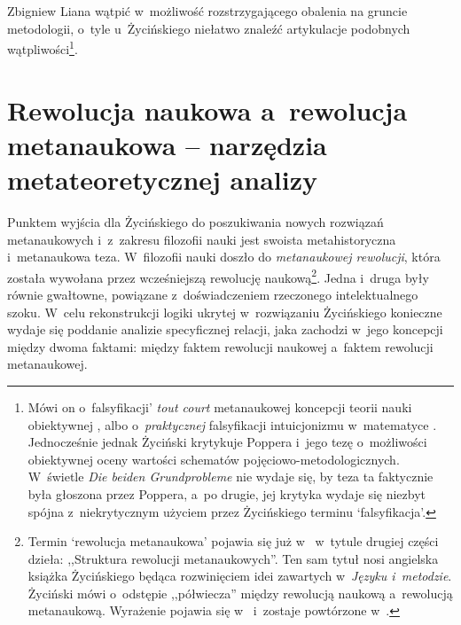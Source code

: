 \begin{artplenv}{Zbigniew Liana}
wątpić w~możliwość rozstrzygającego obalenia na gruncie metodologii, o~tyle u~Życińskiego niełatwo znaleźć artykulacje
podobnych wątpliwości\footnote{Mówi on o~falsyfikacji' \textit{tout court} metanaukowej koncepcji teorii nauki
obiektywnej
\parencites[s.~9]{zycinski_structure_1988}[s.~17]{zycinski_struktura_2013},
albo o~\textit{praktycznej} falsyfikacji
intuicjonizmu w~matematyce
\parencites[s.~97]{zycinski_structure_1988}[s.~174]{zycinski_struktura_2013}.
Jednocześnie jednak Życiński
\parencites*[s.~140]{zycinski_structure_1988}[s.~248]{zycinski_struktura_2013}
krytykuje Poppera i~jego tezę o~możliwości obiektywnej
oceny wartości schematów pojęciowo-metodologicznych. W~świetle \textit{Die beiden Grundprobleme} nie wydaje się, by teza
ta faktycznie była głoszona przez Poppera, a~po drugie, jej krytyka wydaje się niezbyt spójna z~niekrytycznym użyciem
przez Życińskiego terminu `falsyfikacja'.}.

\section{Rewolucja naukowa a~rewolucja metanaukowa -- narzędzia metateoretycznej analizy}

Punktem wyjścia dla Życińskiego do poszukiwania nowych rozwiązań metanaukowych i~z~zakresu filozofii nauki jest swoista
metahistoryczna i~metanaukowa teza. W~filozofii nauki doszło do \textit{metanaukowej rewolucji}, która została wywołana
przez wcześniejszą rewolucję naukową\footnote{Termin `rewolucja metanaukowa' pojawia się już
w~\parencite[s.~99]{zycinski_jezyk_1983}
w~tytule drugiej części dzieła: ,,Struktura rewolucji
metanaukowych''. Ten sam tytuł nosi angielska książka Życińskiego
\parencite*{zycinski_structure_1988}
będąca rozwinięciem
idei zawartych w~\textit{Języku i~metodzie}. Życiński mówi o~odstępie ,,półwiecza'' między rewolucją naukową a~rewolucją
metanaukową. Wyrażenie pojawia się
w~\parencite[s.~101]{zycinski_jezyk_1983}
i~zostaje powtórzone w~\parencite[s.~126]{zycinski_elementy_1996}.
}.
Jedna i~druga były
równie gwałtowne, powiązane z~doświadczeniem rzeczonego intelektualnego szoku. W~celu rekonstrukcji logiki ukrytej w~rozwiązaniu
Życińskiego konieczne wydaje się poddanie analizie specyficznej relacji, jaka zachodzi w~jego koncepcji
między dwoma faktami: między faktem rewolucji naukowej a~faktem rewolucji metanaukowej.


\end{artplenv}
